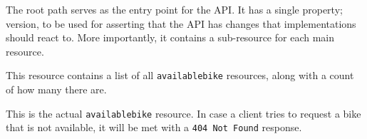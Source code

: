 The root path serves as the entry point for the API.
It has a single property; version, to be used for asserting that the API has changes that implementations should react to.
More importantly, it contains a sub-resource for each main resource.

\noindent\hrulefill

This resource contains a list of all \texttt{availablebike} resources, along with a count of how many there are.

\noindent\hrulefill

This is the actual \texttt{availablebike} resource.
In case a client tries to request a bike that is not available, it will be met with a \texttt{404 Not Found} response.

\noindent\hrulefill


